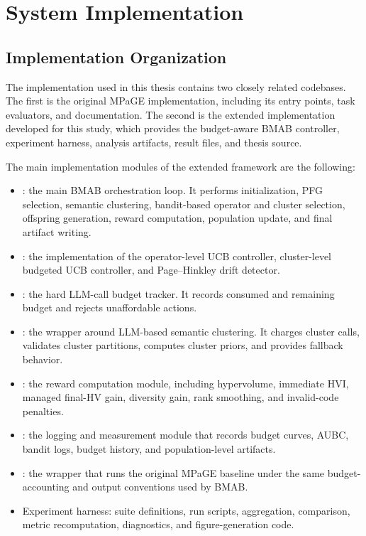 \chapter{System Implementation}

\section{Implementation Organization}

The implementation used in this thesis contains two closely related codebases. The first is the original MPaGE implementation, including its entry points, task evaluators, and documentation. The second is the extended implementation developed for this study, which provides the budget-aware BMAB controller, experiment harness, analysis artifacts, result files, and thesis source.

The main implementation modules of the extended framework are the following:

\begin{itemize}
  \item {}: the main BMAB orchestration loop. It performs initialization, PFG selection, semantic clustering, bandit-based operator and cluster selection, offspring generation, reward computation, population update, and final artifact writing.
  \item {}: the implementation of the operator-level UCB controller, cluster-level budgeted UCB controller, and Page--Hinkley drift detector.
  \item {}: the hard LLM-call budget tracker. It records consumed and remaining budget and rejects unaffordable actions.
  \item {}: the wrapper around LLM-based semantic clustering. It charges cluster calls, validates cluster partitions, computes cluster priors, and provides fallback behavior.
  \item {}: the reward computation module, including hypervolume, immediate HVI, managed final-HV gain, diversity gain, rank smoothing, and invalid-code penalties.
  \item {}: the logging and measurement module that records budget curves, AUBC, bandit logs, budget history, and population-level artifacts.
  \item {}: the wrapper that runs the original MPaGE baseline under the same budget-accounting and output conventions used by BMAB.
  \item Experiment harness: suite definitions, run scripts, aggregation, comparison, metric recomputation, diagnostics, and figure-generation code.
\end{itemize}


